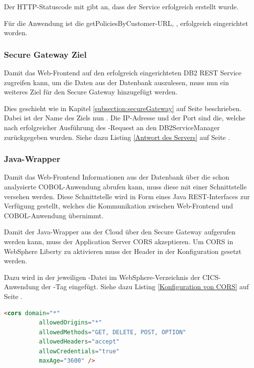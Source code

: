 Der HTTP-Statuscode mit  gibt an, dass der Service erfolgreich erstellt wurde.

Für die Anwendung ist die getPoliciesByCustomer-URL, ,
erfolgreich eingerichtet worden.

\subsubsection{Secure Gateway Ziel}
Damit das Web-Frontend auf den erfolgreich eingerichteten DB2 REST Service zugreifen kann, um die Daten aus der Datenbank
auszulesen, muss nun ein weiteres Ziel für den Secure Gateway hinzugefügt werden.

Dies geschieht wie in Kapitel \ref{subsection:secureGateway} auf Seite \pageref{subsection:secureGateway} beschrieben.
Dabei ist der Name des Ziels nun . Die IP-Adresse und der Port sind die, welche nach erfolgreicher
Ausführung des -Request an den DB2ServiceManager zurückgegeben wurden. Siehe dazu Listing
\ref{Antwort des Servers} auf Seite \pageref{Antwort des Servers}.

\subsubsection{Java-Wrapper}
Damit das Web-Frontend Informationen aus der Datenbank über die schon analysierte COBOL-Anwendung abrufen kann, muss diese
mit einer Schnittstelle versehen werden. Diese Schnittstelle wird in Form eines Java REST-Interfaces zur Verfügung
gestellt, welches die Kommunikation zwischen Web-Frontend und COBOL-Anwendung übernimmt.

Damit der Java-Wrapper aus der Cloud über den Secure Gateway aufgerufen werden kann, muss der Application Server CORS
akzeptieren. Um CORS in WebSphere Liberty zu aktivieren muss der Header in der Konfiguration gesetzt werden.

Dazu wird in der jeweiligen -Datei im WebSphere-Verzeichnis der CICS-Anwendung der -Tag
eingefügt. Siehe dazu Listing \ref{Konfiguration von CORS} auf Seite \pageref{Konfiguration von CORS}.

\begin{lstlisting}[language=html, caption=Konfiguration von CORS, label=Konfiguration von CORS]
    <cors domain="*"
          allowedOrigins="*"
          allowedMethods="GET, DELETE, POST, OPTION"
          allowedHeaders="accept"
          allowCredentials="true"
          maxAge="3600" />
\end{lstlisting}

